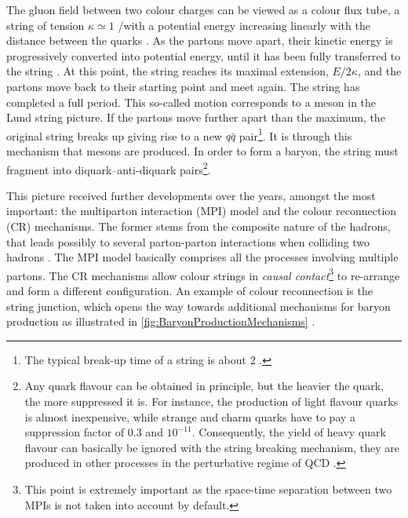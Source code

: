 The gluon field between two colour charges can be viewed as a colour flux tube, a string of tension $\kappa \simeq 1$ \gev/\fm with a potential energy increasing linearly with the distance between the quarks \cite{bierlichComprehensiveGuidePhysics2022}. As the partons move apart, their kinetic energy is progressively converted into potential energy, until it has been fully transferred to the string . At this point, the string reaches its maximal extension, $E/2\kappa$, and the partons move back to their starting point and meet again. The string has completed a full period. This so-called  motion corresponds to a meson in the Lund string picture. If the partons move further apart than the maximum, the original string breaks up giving rise to a new $q \bar{q}$ pair\footnote{The typical break-up time of a string is about 2 \fmC \cite{bierlichComprehensiveGuidePhysics2022}.}. It is through this mechanism that mesons are produced. In order to form a baryon, the string must fragment into diquark--anti-diquark pairs\footnote{Any quark flavour can be obtained in principle, but the heavier the quark, the more suppressed it is. For instance, the production of light flavour quarks is almost inexpensive, while strange and charm quarks have to pay a suppression factor of $0.3$ and $10^{-11}$. Consequently, the yield of heavy quark flavour can basically be ignored with the string breaking mechanism, they are produced in other processes in the perturbative regime of QCD \cite{sjostrandIntroductionPYTHIA2015}.}. 

This picture received further developments over the years, amongst the most important: the multiparton interaction (MPI) model and the colour reconnection (CR) mechanisms. The former stems from the composite nature of the hadrons, that leads possibly to several parton-parton interactions when colliding two hadrons \cite{sjostrandDevelopmentMPIModelling2017}. The MPI model basically comprises all the processes involving multiple partons. The CR mechanisms allow colour strings in \textit{causal contact}\footnote{This point is extremely important as the space-time separation between two MPIs is not taken into account by default.} to re-arrange and form a different configuration. An example of colour reconnection is the string junction, which opens the way towards additional mechanisms for baryon production as illustrated in \fig\ref{fig:BaryonProductionMechanisms} \cite{heleniusRecentPythiaDevelopments2016}.\\

